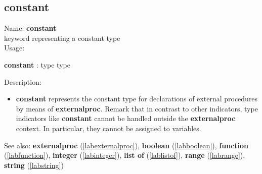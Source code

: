 \subsection{constant}
\label{labconstant}
\noindent Name: \textbf{constant}\\
keyword representing a \textsf{constant} type \\

\noindent Usage: 
\begin{center}
\textbf{constant} : \textsf{type type}\\
\end{center}
\noindent Description: \begin{itemize}

\item \textbf{constant} represents the \textsf{constant} type for declarations
   of external procedures by means of \textbf{externalproc}.
   Remark that in contrast to other indicators, type indicators like
   \textbf{constant} cannot be handled outside the \textbf{externalproc} context.  In
   particular, they cannot be assigned to variables.
\end{itemize}
See also: \textbf{externalproc} (\ref{labexternalproc}), \textbf{boolean} (\ref{labboolean}), \textbf{function} (\ref{labfunction}), \textbf{integer} (\ref{labinteger}), \textbf{list of} (\ref{lablistof}), \textbf{range} (\ref{labrange}), \textbf{string} (\ref{labstring})
